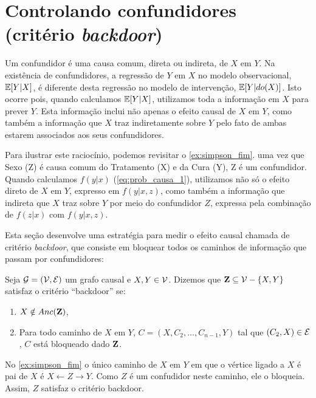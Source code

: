 \section{Controlando confundidores (critério \textit{backdoor})}
\label{sec:backdoor}

Um confundidor é uma causa comum, 
direta ou indireta, de $X$ em $Y$.
Na existência de confundidores,
a regressão de $Y$ em $X$ no modelo observacional, 
${\mathbb E}[Y|X]$, é diferente desta regressão
no modelo de intervenção, ${\mathbb E}[Y|do(X)]$.
Isto ocorre pois, quando calculamos ${\mathbb E}[Y|X]$,
utilizamos toda a informação em $X$ para prever $Y$.
Esta informação inclui não apenas 
o efeito causal de $X$ em $Y$, como 
também a informação que $X$ traz indiretamente sobre $Y$ 
pelo fato de ambas estarem associados aos seus confundidores.

Para ilustrar este raciocínio, 
podemos revisitar o \cref{ex:simpson_fim}.
uma vez que Sexo (Z) é causa comum do Tratamento (X) e
da Cura (Y), Z é um confundidor.
Quando calculamos $f(y|x)$ (\cref{eq:prob_causa_1}), 
utilizamos não só o efeito direto de $X$ em $Y$, 
expresso em $f(y|x,z)$, como também 
a informação que indireta que $X$ traz sobre $Y$
por meio do confundidor $Z$,
expressa pela combinação de $f(z|x)$ com $f(y|x,z)$.

Esta seção desenvolve uma estratégia para
medir o efeito causal chamada de 
critério \textit{backdoor}, que
consiste em bloquear 
todos os caminhos de informação que passam por confundidores:

\begin{definition}
 \label{def:backdoor}
 Seja ${\mathcal G} = ({\mathcal V}, {\mathcal E})$ um grafo causal e $X, Y \in {\mathcal V}$.
 Dizemos que ${\mathbf{Z}} \subseteq {\mathcal V} - \{X,Y\}$ satisfaz 
 o critério ``backdoor'' se:
 \begin{enumerate}
  \item $X \notin Anc({\mathbf{Z}})$,
  \item Para todo caminho de $X$ em $Y$, 
  $C = (X, C_2, \ldots, C_{n-1}, Y)$ tal que
  $(C_2, X) \in {\mathcal E}$, $C$ está bloqueado dado ${\mathbf{Z}}$.
 \end{enumerate}
\end{definition}

\begin{example}
 No \cref{ex:simpson_fim} o único caminho de $X$ em $Y$ em que
 o vértice ligado a $X$ é pai de $X$ é $X \leftarrow Z \rightarrow Y$.
 Como $Z$ é um confudidor neste caminho, ele o bloqueia.
 Assim, $Z$ satisfaz o critério backdoor.
\end{example}

